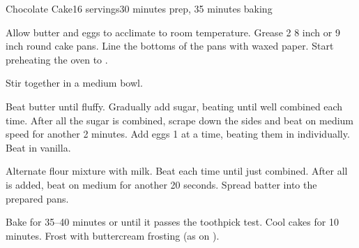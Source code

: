 \documentclass[../Cookbook.tex]{subfiles}
\begin{document}
\begin{recipe}{Chocolate Cake}{16 servings}{30 minutes prep, 35 minutes baking}

Allow butter and eggs to acclimate to room temperature. Grease 2 8 inch or 9  inch round cake pans. Line the bottoms of the pans with waxed paper. Start preheating the oven to .

Stir together in a medium bowl.

Beat butter until fluffy. Gradually add sugar, beating until well combined each time. After all the sugar is combined, scrape down the sides and beat on medium speed for another 2 minutes. Add eggs 1 at a time, beating them in individually. Beat in vanilla.

Alternate flour mixture with milk. Beat each time until just combined. After all is added, beat on medium for another 20 seconds. Spread batter into the prepared pans.

\newstep
Bake for 35--40 minutes or until it passes the toothpick test. Cool cakes for 10 minutes. Frost with buttercream frosting (as on ).

\end{recipe}
\end{document}
